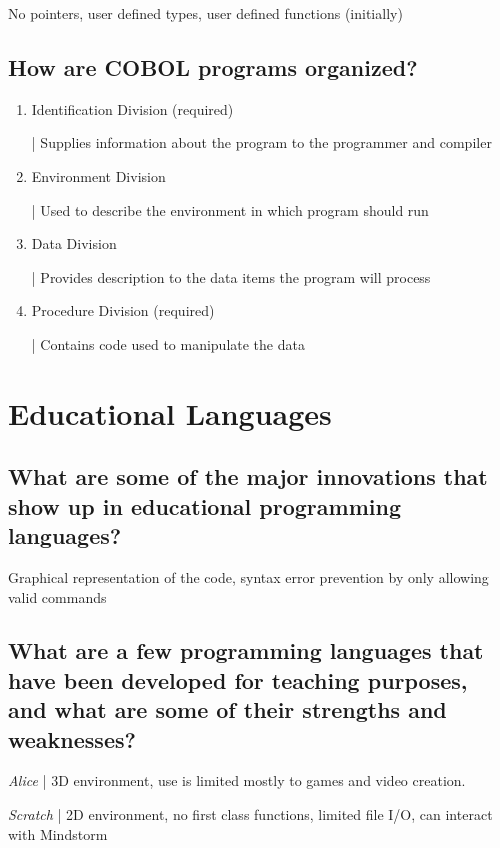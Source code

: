 \documentclass{article}
\newcommand{\define}[1]{\noindent\textit{#1} | }
\begin{document}
\noindent No pointers, user defined types, user defined functions (initially)

\subsection{How are COBOL programs organized?}

\begin{enumerate}
	\item Identification Division (required)
		
		| Supplies information about the program to the programmer and compiler
		
	\item Environment Division
	
		| Used to describe the environment in which program should run
		
	\item Data Division
	
		| Provides description to the data items the program will process
		
	\item Procedure Division (required)
	
		| Contains code used to manipulate the data
\end{enumerate}

\section{Educational Languages}

\subsection{What are some of the major innovations that show up in educational programming languages?}

Graphical representation of the code, syntax error prevention by only allowing valid commands

\subsection{What are a few programming languages that have been developed for teaching purposes, and what are some of their strengths and weaknesses?}

\define{Alice} 3D environment, use is limited mostly to games and video creation.

\define{Scratch} 2D environment, no first class functions, limited file I/O, can interact with Mindstorm
\end{document}
